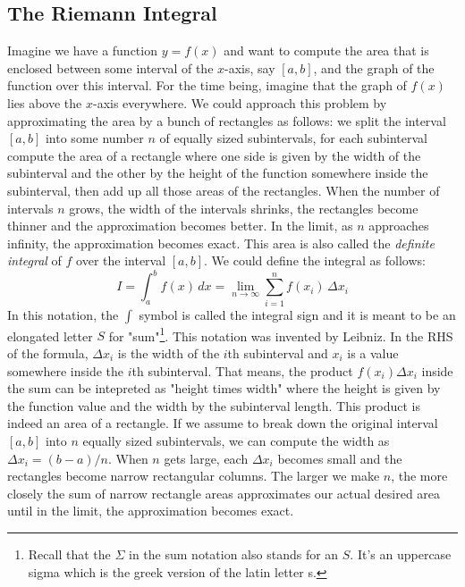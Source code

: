\subsection{The Riemann Integral} 
Imagine we have a function $y = f(x)$ and want to compute the area that is enclosed between some interval of the $x$-axis, say $[a,b]$, and the graph of the function over this interval. For the time being, imagine that the graph of $f(x)$ lies above the $x$-axis everywhere. We could approach this problem by approximating the area by a bunch of rectangles as follows: we split the interval $[a,b]$ into some number $n$ of equally sized subintervals, for each subinterval compute the area of a rectangle where one side is given by the width of the subinterval and the other by the height of the function somewhere inside the subinterval, then add up all those areas of the rectangles. When the number of intervals $n$ grows, the width of the intervals shrinks, the rectangles become thinner and the approximation becomes better. In the limit, as $n$ approaches infinity, the approximation becomes exact. This area is also called the \emph{definite integral} of $f$ over the interval $[a,b]$. We could define the integral as follows:
\begin{equation}
\label{Eq:RiemannIntegral1D}	
 I = \int_a^b f(x) \, dx = \lim_{n \rightarrow \infty}  \sum_{i=1}^n f(x_i) \, \Delta x_i
\end{equation}
In this notation, the $\int$ symbol is called the integral sign and it is meant to be an elongated letter $S$ for "sum"\footnote{Recall that the $\Sigma$ in the sum notation also stands for an $S$. It's an uppercase sigma which is the greek version of the latin letter s.}. This notation was invented by Leibniz. In the RHS of the formula, $\Delta x_i$ is the width of the $i$th subinterval and $x_i$ is a value somewhere inside the $i$th subinterval. That means, the product $f(x_i)  \Delta x_i$ inside the sum can be intepreted as "height times width" where the height is given by the function value and the width by the subinterval length. This product is indeed an area of a rectangle. If we assume to break down the original interval $[a,b]$ into $n$ equally sized subintervals, we can compute the width as $\Delta x_i = (b-a)/n$. When $n$ gets large, each $\Delta x_i$ becomes small and the rectangles become narrow rectangular columns. The larger we make $n$, the more closely the sum of narrow rectangle areas approximates our actual desired area until in the limit, the approximation becomes exact.

